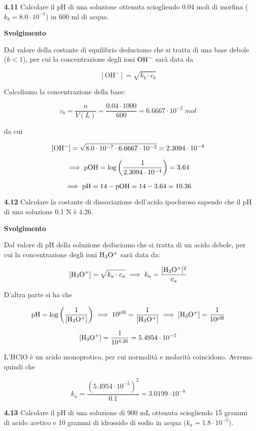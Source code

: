 \vspace{0.2cm}\textbf{4.11} Calcolare il pH di una soluzione ottenuta sciogliendo 0.04 moli di morfina ($k_b = 8.0 \cdot 10^{-7}$) in 600 ml di acqua.

\vspace{0.2cm}\large\textbf{Svolgimento}\normalsize

\vspace{0.2cm}Dal valore della costante di equilibrio deduciamo che si tratta di una base debole ($k<1$), per cui la concentrazione degli ioni $\rm OH^-$ sarà data da

$$[\text{OH}^-]=\sqrt{k_b \cdot c_b}$$

Calcoliamo la concentrazione della base:

$$c_b=\frac{n}{V(L)}=
\frac{0.04 \cdot 1000}{600}=6.6667 \cdot 10^{-2}\;mol$$

da cui

$$\rm [OH^-]=\sqrt{8.0 \cdot 10^{-7} \cdot 6.6667 \cdot 10^{-2}}
=2.3094 \cdot 10^{-4}$$

$$\implies \rm pOH=\log{\left(\frac{1}{2.3094 \cdot 10^{-4}}\right)}
=3.64$$

$$\implies \rm pH=14 - pOH
=14-3.64=10.36$$

\vspace{0.2cm}\textbf{4.12} Calcolare la costante di dissociazione dell'acido ipocloroso sapendo che il pH di una soluzione 0.1 N è 4.26.

\vspace{0.2cm}\large\textbf{Svolgimento}\normalsize

\vspace{0.2cm}Dal valore di pH della soluzione deduciamo che si tratta di un acido debole, per cui la concentrazione degli ioni $\rm H_3O^+$ sarà data da:

$$[\text{H}_3\text{O}^+]=\sqrt{k_a \cdot c_a}
\implies
k_a=\frac{[\rm H_3O^+]^2}{c_a}$$

D'altra parte si ha che

$$\rm pH=\log{\left( \frac{1}{[H_3O^+]} \right)}
\implies
10^{pH}=\frac{1}{[H_3O^+]}
\implies
[H_3O^+]=\frac{1}{10^{pH}}$$

$$\rm [H_3O^+]=\frac{1}{10^{4.26}}=5.4954 \cdot 10^{-5}$$

L'HClO è un acido monoprotico, per cui normalità e molarità coincidono. Avremo quindi che

$$k_a=\frac{(5.4954 \cdot 10^{-5})^2}{0.1}
=3.0199 \cdot 10^{-8}$$

\vspace{0.2cm}\textbf{4.13} Calcolare il pH di una soluzione di 900 mL ottenuta sciogliendo 15 grammi di acido acetico e 10 grammi di idrossido di sodio in acqua ($k_a = 1.8 \cdot 10^{-5}$).

